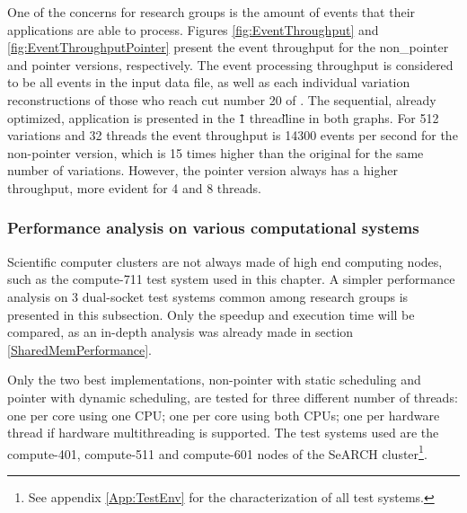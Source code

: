 One of the concerns for research groups is the amount of events that their applications are able to process. Figures \ref{fig:EventThroughput} and \ref{fig:EventThroughputPointer} present the event throughput for the non_pointer and pointer versions, respectively. The event processing throughput is considered to be all events in the input data file, as well as each individual variation reconstructions of those who reach cut number 20 of \tth. The sequential, already optimized, application is presented in the \"1 thread\" line in both graphs. For 512 variations and 32 threads the event throughput is 14300 events per second for the non-pointer version, which is 15 times higher than the original for the same number of variations. However, the pointer version always has a higher throughput, more evident for 4 and 8 threads.

\subsubsection{Performance analysis on various computational systems}
\label{SharedMemPerformanceVarious}

Scientific computer clusters are not always made of high end computing nodes, such as the compute-711 test system used in this chapter. A simpler performance analysis on 3 dual-socket test systems common among research groups is presented in this subsection. Only the speedup and execution time will be compared, as an in-depth analysis was already made in section \ref{SharedMemPerformance}.

Only the two best implementations, non-pointer with static scheduling and pointer with dynamic scheduling, are tested for three different number of threads: one per core using one CPU; one per core using both CPUs; one per hardware thread if hardware multithreading is supported. The test systems used are the compute-401, compute-511 and compute-601 nodes of the SeARCH cluster\footnote{See appendix \ref{App:TestEnv} for the characterization of all test systems.}.

